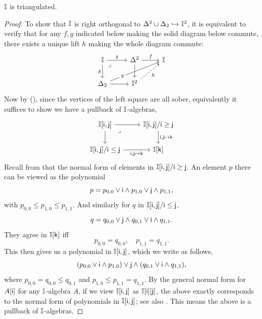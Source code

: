 \begin{proposition}[\AxiomSQCF]\label{specistriangulated}
  $\mathbb{I}$ is triangulated.
\end{proposition}
\begin{proof}
  To show that $\mathbb{I}$ is right orthogonal to $\Delta^2 \cup \Delta_2 \hookrightarrow \mathbb{I}^2$, it is equivalent to verify that for any $f,g$ indicated below making the solid diagram below commute, there exists a unique lift $h$ making the whole diagram commute:
  \[\begin{tikzcd}
    \I \ar[r, "\delta"] \ar[d, "\delta"'] & \Delta^2 \ar[r, "f"] \ar[d] & \I \\
    \Delta_2 \ar[urr, "g"{description, near start}] \ar[r] & \I^2 \ar[ur, dashed, "h"']
    \arrow["\lrcorner"{anchor=center, pos=0.125}, draw=none, from=1-1, to=2-2]
  \end{tikzcd}\]
  Now by (\AxiomSQCF), since the vertices of the left square are all sober, equivalently it suffices to show we have a pullback of $\mathbb{I}$-algebras,
  \[\begin{tikzcd}
    {\I[\ms{i},\ms{j}]} \ar[r] \ar[d] & {\I[\ms{i},\ms{j}]/\ms{i} \ge \ms{j}} \ar[d, "{\ms{i},\ms{j} \mapsto\ms{k}}"] \\
    {\I[\ms{i},\ms{j}]/\ms{i} \le \ms{j}} \ar[r, "{\ms{i},\ms{j}\mapsto\ms{k}}"'] & {\I[\ms{k}]}
    \arrow["\lrcorner"{anchor=center, pos=0.125}, draw=none, from=1-1, to=2-2]
  \end{tikzcd}\]
  Recall from  that the normal form of elements in $\mathbb{I}[\mathsf{i},\mathsf{j}]/\mathsf{i}\ge \mathsf{j}$. An element $p$ there can be viewed as the polynomial 
  \[ p = p_{0,0} \vee \ms{i}\wedge p_{1,0} \vee \ms{j}\wedge p_{1,1}\text{,} \]
  with $p_{0,0} \le p_{1,0} \le p_{1,1}$. And similarly for $q$ in $\mathbb{I}[\mathsf{i},\mathsf{j}]/\mathsf{i} \le \mathsf{j}$, 
  \[ q = q_{0,0} \vee \ms{j} \wedge q_{0,1} \vee \ms{i} \wedge q_{1,1}\text{.} \]
  They agree in $\mathbb{I}[\mathsf{k}]$ iff 
  \[ p_{0,0} = q_{0,0}, \quad p_{1,1} = q_{1,1}\text{.} \]
  This then gives us a polynomial in $\mathbb{I}[\mathsf{i},\mathsf{j}]$, which we write as follows,
  \[ (p_{0,0} \vee \ms{i} \wedge p_{1,0}) \vee \ms{j} \wedge (q_{0,1} \vee \ms{i} \wedge q_{1,1})\text{,} \]
  where $p_{0,0} = q_{0,0} \le q_{0,1}$ and $p_{1,0} \le p_{1,1} = q_{1,1}$. 
  By the general normal form for $A[\mathsf{i}]$ for any $\mathbb{I}$-algebra $A$, if we view $\mathbb{I}[\mathsf{i},\mathsf{j}]$ as $\mathbb{I}[\mathsf{i}][\mathsf{j}]$, the above exactly corresponds to the normal form of polynomials in $\mathbb{I}[\mathsf{i},\mathsf{j}]$; see also \citet[Ch.\ 1, Thm.\ 10.21]{lausch2000algebra}. This means the above is a pullback of $\mathbb{I}$-algebras.
\end{proof}



